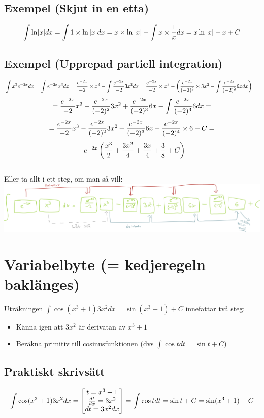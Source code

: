 \documentclass{article}
\begin{document}
\subsection{Exempel (Skjut in en etta)}
$$ \int{\ln \lvert x\rvert dx}=\int{1\times \ln{\lvert x\rvert} dx} = x \times \ln{\lvert x\rvert} - \int{x \times \frac{1}{x} dx} = x \ln{\lvert x\rvert} - x + C $$

\subsection{Exempel (Upprepad partiell integration)}
$$ \int{x^3 e^{-2x} dx} = \int{e^{-2x}x^3 dx} = \frac{e^{-2x}}{-2} \times x^3 - \int{\frac{e^{-2x}}{-2} 3x^2 dx} = \frac{e^{-2x}}{-2}\times x^3 - \left( \frac{e^{-2x}}{(-2)^2}\times 3x^2 - \int{\frac{e^{-2x}}{(-2)^2} 6x dx}\right)=$$
$$ = \frac{e^{-2x}}{-2}x^3  - \frac{e^{-2x}}{(-2)^2} 3x^2 + \frac{e^{-2x}}{(-2)^3}6x - \int{\frac{e^{-2x}}{(-2)^3} 6 dx}=$$
$$ = \frac{e^{-2x}}{-2}x^3  - \frac{e^{-2x}}{(-2)^2} 3x^2 + \frac{e^{-2x}}{(-2)^3}6x - \frac{e^{-2x}}{(-2)^4}\times 6 + C=$$
$$ -e^{-2x}\left(\frac{x^3}{2} + \frac{3x^2}{4} + \frac{3x}{4} + \frac{3}{8} + C\right) $$
\\
Eller ta allt i ett steg, om man så vill:\\
\includegraphics[scale=0.3]{img/img2.pdf}

\section{Variabelbyte (= kedjeregeln baklänges)}
Uträkningen $\int{\cos(x^3+1)3x^2 dx} = \sin\left(x^3+1\right) + C$ innefattar två steg:
\begin{itemize}
    \item Känna igen att $3x^2$ är derivatan av $x^3+1$
    \item Beräkna primitiv till cosinusfunktionen (dvs $\int{\cos t dt} = \sin t + C$)
\end{itemize}

\subsection{Praktiskt skrivsätt}
$$ \int{\cos(x^3+1)3x^2 dx} = \left[\begin{matrix}t=x^3+1 \\ \frac{dt}{dx} = 3x^2 \\ dt=3x^2 dx\end{matrix}\right] = \int{\cos t dt} = \sin t + C = \sin (x^3+1) + C$$
\end{document}
